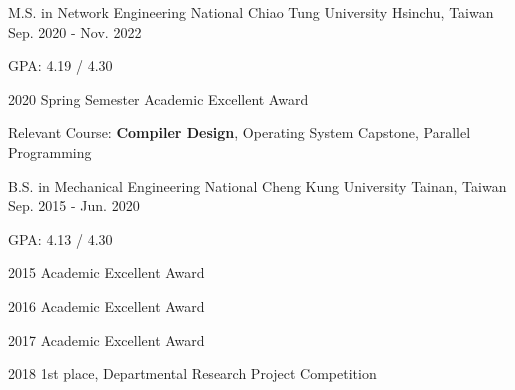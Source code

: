 

\begin{cventries}

  \cventry
    {M.S. in Network Engineering} %
    {National Chiao Tung University} %
    {Hsinchu, Taiwan} %
    {Sep. 2020 - Nov. 2022} %
    {
      \begin{cvitems} %
        \item {GPA: 4.19 / 4.30}
        \item {2020 Spring Semester Academic Excellent Award}
        \item {Relevant Course: \textbf{Compiler Design}, Operating System Capstone, Parallel Programming}
      \end{cvitems}
    }

  \cventry
    {B.S. in Mechanical Engineering} %
    {National Cheng Kung University} %
    {Tainan, Taiwan} %
    {Sep. 2015 - Jun. 2020} %
    {
      \vspace{14pt}
      \begin{cvitems} %
        \item {GPA: 4.13 / 4.30}
        \item {2015 Academic Excellent Award}
        \item {2016 Academic Excellent Award}
        \item {2017 Academic Excellent Award}
        \item {2018 1st place, Departmental Research Project Competition}
      \end{cvitems}
    }

\end{cventries}
